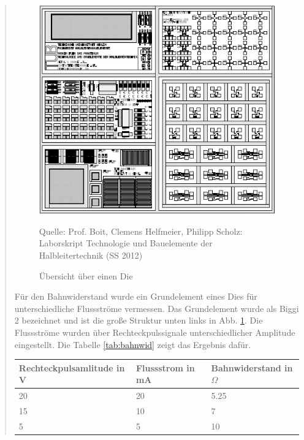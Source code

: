 \begin{quote}
	\begin{figure}[H]
        \centering
        \includegraphics[scale=0.8]{./SchaltverhaltenBilder/Die_uebersicht.jpg}
        \caption{Übersicht über einen Die}
             \begin{center}
                 \small Quelle: Prof. Boit, Clemens Helfmeier, Philipp Scholz: Laborskript Technologie und Bauelemente der Halbleitertechnik (SS 2012)
             \end{center}
        \label{fig:Die}
    \end{figure}

	\vspace{2em}


	Für den Bahnwiderstand wurde ein Grundelement eines Dies für
	unterschiedliche Flussströme vermessen. Das Grundelement wurde als Biggi 2
	bezeichnet und ist die große Struktur unten links in Abb. \ref{fig:Die}. Die
	Flussströme wurden über Rechteckpulssignale unterschiedlicher Amplitude
	eingestellt. Die Tabelle \ref{tab:bahnwid} zeigt das Ergebnis dafür.\\


	\vspace{2em}

      		\begin{table}[H]
     		  \begin{addmargin}[3cm]{3cm}
     			\centering
                   \begin{tabular}{|p{3cm}|p{3cm}|p{3cm}|}
         			\hline
         			Rechteckpulsamlitude in V & Flussstrom in mA &  Bahnwiderstand in $\Omega$\\
         			\hline
        			20 & 20 & 5.25 \\
        			\hline
                    15 & 10 & 7    \\
                    \hline
                    5 & 5 & 10     \\
                    \hline


\end{tabular}
\end{addmargin}
\end{table}
\end{quote}
